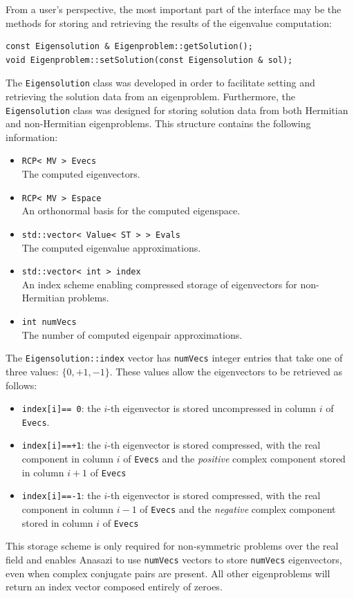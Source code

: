 \documentclass[acmtoms]{acmtrans2m}
\newcommand{\aspace}[1]{\texttt{#1}}
\begin{document}
From a user's perspective, the most important part of the interface may be the methods 
for storing and retrieving the results of the eigenvalue computation:
\begin{verbatim}
const Eigensolution & Eigenproblem::getSolution();
void Eigenproblem::setSolution(const Eigensolution & sol);
\end{verbatim}
The \aspace{Eigensolution} class was developed in order to
facilitate setting and retrieving the solution data from an eigenproblem.  
Furthermore, the \aspace{Eigensolution} class was designed for storing
solution data from both Hermitian and non-Hermitian eigenproblems. 
This structure contains the following information:
\begin{itemize}
  \item \verb!RCP< MV > Evecs! \\
   The computed eigenvectors.
 \item \verb!RCP< MV > Espace! \\
   An orthonormal basis for the computed eigenspace.
 \item \verb!std::vector< Value< ST > > Evals! \\
   The computed eigenvalue approximations.
 \item \verb!std::vector< int > index! \\
   An index scheme enabling compressed storage of eigenvectors for non-Hermitian problems.
 \item \verb!int numVecs! \\
   The number of computed eigenpair approximations.
\end{itemize}
The \aspace{Eigensolution::index} vector has \aspace{numVecs} integer entries that take 
one of three values: $\{0, +1, -1\}$. These values allow the eigenvectors to be retrieved as follows:
\begin{itemize}
  \item \aspace{index[i]== 0}: the $i$-th eigenvector is stored uncompressed in column $i$ of
    \verb!Evecs!.
  \item \aspace{index[i]==+1}: the $i$-th eigenvector is stored compressed, with the real
    component in column $i$ of \verb!Evecs! and the \emph{positive} complex component
    stored in column $i+1$ of \verb!Evecs!
  \item \aspace{index[i]==-1}: the $i$-th eigenvector is stored compressed, with the real
    component in column $i-1$ of \verb!Evecs! and the \emph{negative} complex component
    stored in column $i$ of \verb!Evecs!
\end{itemize}
This storage scheme is only required for non-symmetric problems over the real field and enables
Anasazi to use \aspace{numVecs} vectors to store \aspace{numVecs} eigenvectors, even when
complex conjugate pairs are present.  All other eigenproblems will return an index vector 
composed entirely of zeroes. 
\end{document}
